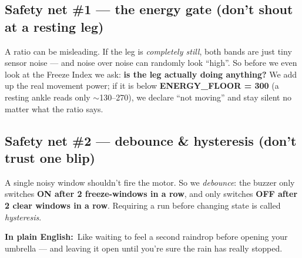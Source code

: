 \documentclass[11pt]{article}
\newcommand{\pe}{\textbf{\color{teal}In plain English:}\ }
\begin{document}
\subsection{Safety net \#1 --- the energy gate (don't shout at a resting leg)}
A ratio can be misleading. If the leg is \emph{completely still}, both bands are
just tiny sensor noise --- and noise over noise can randomly look ``high''. So
before we even look at the Freeze Index we ask: \textbf{is the leg actually doing
anything?} We add up the real movement power; if it is below
\textbf{ENERGY\_FLOOR = 300} (a resting ankle reads only $\sim$130--270), we
declare ``not moving'' and stay silent no matter what the ratio says.

\subsection{Safety net \#2 --- debounce \& hysteresis (don't trust one blip)}
A single noisy window shouldn't fire the motor. So we \emph{debounce}: the buzzer
only switches \textbf{ON after 2 freeze-windows in a row}, and only switches
\textbf{OFF after 2 clear windows in a row}. Requiring a run before changing
state is called \emph{hysteresis}.

\pe Like waiting to feel a second raindrop before opening your umbrella --- and
leaving it open until you're sure the rain has really stopped.

\begin{center}
\end{center}
\end{document}
